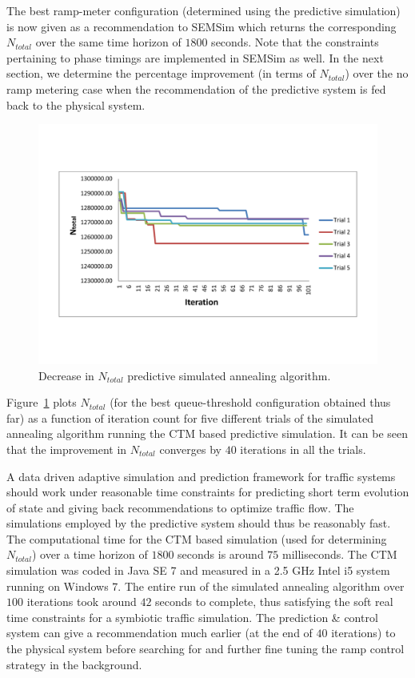 \documentclass{wscpaperproc}
\theoremstyle{wsc}
\begin{document}
The best ramp-meter configuration (determined using the predictive simulation) is now given as a recommendation to SEMSim which returns the corresponding $N_{total}$ over the same time horizon of $1800$ seconds. Note that the constraints pertaining to phase timings are implemented in SEMSim as well. In the next section, we determine the percentage improvement (in terms of $N_{total}$) over the no ramp metering case when the recommendation of the predictive system is fed back to the physical system.


\begin{figure}[!htbp]
    \centering
    \includegraphics[clip=true,trim=1.5cm 4.0cm 1.7cm 4.0cm,scale=0.32]{images/CTM-improvement.pdf}
   \caption{Decrease in $N_{total}$ predictive simulated annealing algorithm.}
   \label{fig:ctm-improvement}
  \end{figure}
  
Figure~\ref{fig:ctm-improvement} plots $N_{total}$ (for the best queue-threshold configuration obtained thus far) as a function of iteration count for five different trials of the simulated annealing algorithm running the CTM based predictive simulation. It can be seen that the improvement in $N_{total}$ converges by $40$ iterations in all the trials.

A data driven adaptive simulation and prediction framework for traffic systems should work under reasonable time constraints for predicting short term evolution of state and giving back recommendations to optimize traffic flow. The simulations employed by the predictive system should thus be reasonably fast. The computational time for the CTM based simulation (used for determining $N_{total}$) over a time horizon of $1800$ seconds is around $75$ milliseconds. The CTM simulation was coded in Java SE 7 and measured in a 2.5 GHz Intel i5 system running on Windows 7. The entire run of the simulated annealing algorithm over $100$ iterations took around $42$ seconds to complete, thus satisfying the soft real time constraints for a symbiotic traffic simulation. The prediction \& control system can give a recommendation much earlier (at the end of $40$ iterations) to the physical system before searching for and further fine tuning the ramp control strategy in the background.
  
\end{document}
